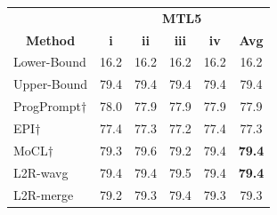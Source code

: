 \documentclass[11pt]{article}
\begin{document}
\begin{table}[]
\centering
\begin{tabular}{lccccc}
\hline
\textbf{}                           & \multicolumn{5}{c}{\textbf{MTL5}}                                                                                                                                    \\
\multicolumn{1}{c}{\textbf{Method}} & \textbf{i}               & \textbf{ii}               & \textbf{iii}               & \textbf{iv}               & \textbf{Avg}             \\
\hline
Lower-Bound                         & 16.2                           & 16.2                           & 16.2                           & 16.2                           & 16.2                             \\
Upper-Bound                         & 79.4                           & 79.4                           & 79.4                           & 79.4                           & 79.4                             \\
\hline
ProgPrompt$\dagger$                          & 78.0                           & 77.9                           & 77.9                           & 77.9                           & 77.9                             \\
EPI$\dagger$                                 & 77.4                           & 77.3                           & 77.2                           & 77.4                           & 77.3                             \\
MoCL$\dagger$                                & 79.3                           & 79.6                           & 79.2                           & 79.4                           & \textbf{79.4}                             \\
L2R-wavg                            & 79.4                           & 79.4                           & 79.5                           & 79.4                           & \textbf{79.4}                             \\
L2R-merge                          & 79.2                           & 79.3                           & 79.4                           & 79.3                           & 79.3                            \\

\end{tabular}
\end{table}
\end{document}
